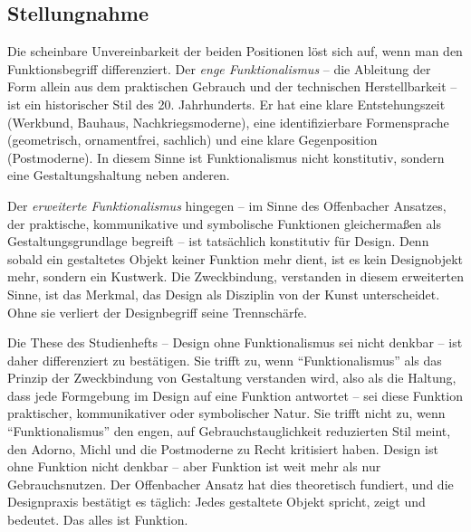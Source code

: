 \documentclass[
    a4paper,
    11pt,
    bibliography=totoc,
    listof=totoc,
    parskip=half,
    headings=normal
]{scrbook}
\begin{document}
\subsection{Stellungnahme}
Die scheinbare Unvereinbarkeit der beiden Positionen löst sich auf, wenn man den Funktionsbegriff differenziert. Der \textit{enge Funktionalismus} -- die Ableitung der Form allein aus dem praktischen Gebrauch und der technischen Herstellbarkeit -- ist ein historischer Stil des 20. Jahrhunderts. Er hat eine klare Entstehungszeit (Werkbund, Bauhaus, Nachkriegsmoderne), eine identifizierbare Formensprache (geometrisch, ornamentfrei, sachlich) und eine klare Gegenposition (Postmoderne). In diesem Sinne ist Funktionalismus nicht konstitutiv, sondern eine Gestaltungshaltung neben anderen.

Der \textit{erweiterte Funktionalismus} hingegen -- im Sinne des Offenbacher Ansatzes, der praktische, kommunikative und symbolische Funktionen gleichermaßen als Gestaltungsgrundlage begreift -- ist tatsächlich konstitutiv für Design. Denn sobald ein gestaltetes Objekt keiner Funktion mehr dient, ist es kein Designobjekt mehr, sondern ein Kustwerk. Die Zweckbindung, verstanden in diesem erweiterten Sinne, ist das Merkmal, das Design als Disziplin von der Kunst unterscheidet. Ohne sie verliert der Designbegriff seine Trennschärfe.

Die These des Studienhefts -- Design ohne Funktionalismus sei nicht denkbar -- ist daher differenziert zu bestätigen. Sie trifft zu, wenn \enquote{Funktionalismus} als das Prinzip der Zweckbindung von Gestaltung verstanden wird, also als die Haltung, dass jede Formgebung im Design auf eine Funktion antwortet -- sei diese Funktion praktischer, kommunikativer oder symbolischer Natur. Sie trifft nicht zu, wenn \enquote{Funktionalismus} den engen, auf Gebrauchstauglichkeit reduzierten Stil meint, den Adorno, Michl und die Postmoderne zu Recht kritisiert haben. Design ist ohne Funktion nicht denkbar -- aber Funktion ist weit mehr als nur Gebrauchsnutzen. Der Offenbacher Ansatz hat dies theoretisch fundiert, und die Designpraxis bestätigt es täglich: Jedes gestaltete Objekt spricht, zeigt und bedeutet. Das alles ist Funktion.

\backmatter

\printbibliography
\listoffigures
\end{document}
